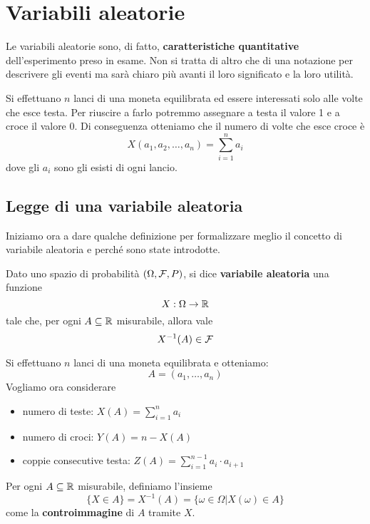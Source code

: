 \chapter{Variabili aleatorie}
Le variabili aleatorie sono, di fatto, \textbf{caratteristiche quantitative} dell'esperimento
preso in esame. Non si tratta di altro che di una notazione per descrivere gli eventi ma sarà
chiaro più avanti il loro significato e la loro utilità.

\begin{example}
	Si effettuano $n$ lanci di una moneta equilibrata ed essere interessati solo alle volte che
	esce testa. Per riuscire a farlo potremmo assegnare a testa il valore 1 e a croce il valore 0.
	Di conseguenza otteniamo che il numero di volte che esce croce è
	\[ X(a_1, a_2, \dots, a_n) = \sum_{i=1}^n a_i \]
	dove gli $a_i$ sono gli esisti di ogni lancio.
\end{example}

\section{Legge di una variabile aleatoria}
Iniziamo ora a dare qualche definizione per formalizzare meglio il concetto di variabile aleatoria
e perché sono state introdotte.

\begin{definition}
	Dato uno spazio di probabilità $(\Omega, \mathcal{F}, P)$, si dice \textbf{variabile aleatoria} una
	funzione
	\[ X : \Omega \to \mathbb{R} \]
	tale che, per ogni $A \subseteq \mathbb{R}$ misurabile, allora vale
	\[ X^{-1}(A) \in \mathcal{F} \]
\end{definition}

\begin{example}
	Si effettuano $n$ lanci di una moneta equilibrata e otteniamo:
	\[ A = (a_1, \dots, a_n) \]
	Vogliamo ora considerare
	\begin{itemize}
		\item numero di teste: $X(A) = \sum_{i=1}^n a_i$
		\item numero di croci: $Y(A) = n - X(A)$
		\item coppie consecutive testa: $Z(A) = \sum_{i=1}^{n-1} a_i \cdot a_{i+1}$
	\end{itemize}
\end{example}

\begin{definition}
	Per ogni $A \subseteq \mathbb{R}$ misurabile, definiamo l'insieme
	\[ \{ X \in A \} = X^{-1}(A) = \{\omega \in \Omega | X(\omega) \in A \} \]
	come la \textbf{controimmagine} di $A$ tramite $X$.
\end{definition}

